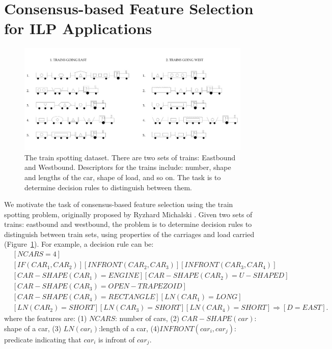 \section{Consensus-based Feature Selection for ILP Applications}
\label{sec:example}

\begin{figure}[h]
\centerline{\includegraphics[width=1\textwidth,height=0.32\textheight ]{trains.jpg}}
\caption{The train spotting dataset. There are two sets of trains: Eastbound and Westbound. Descriptors for the trains include: number, shape and lengths of the car, shape of load, and so on. The task is to determine decision rules to distinguish between them. }
\label{trains}
\end{figure} 

\noindent We motivate the task of consensus-based feature selection using the train spotting problem, originally proposed by Ryzhard Michalski \cite{Larson_77}. Given two sets of trains: eastbound and westbound, the problem is to determine decision rules to distinguish between train sets, using properties of the carriages and load carried (Figure~\ref{trains}). For example, a decision rule can be: 
 \begin{align} 
 \nonumber &[NCARS=4] \\ 
  \nonumber &[IF (CAR_1, CAR_2)][INFRONT(CAR_2,CAR_3)][INFRONT(CAR_3,CAR_4)] \\
 \nonumber
 &[CAR-SHAPE(CAR_1)=ENGINE] [CAR-SHAPE(CAR_2)=U-SHAPED] \\
 \nonumber &[CAR-SHAPE(CAR_3)=OPEN-TRAPEZOID] \\
 \nonumber &[CAR-SHAPE(CAR_4)=RECTANGLE][LN(CAR_1)=LONG] \\
 \nonumber &[LN(CAR_2)=SHORT][LN(CAR_3)=SHORT][LN(CAR_4)=SHORT] \Rightarrow [D=EAST].
\end{align}
where the features are: (1) $NCARS$: number of cars, (2) $CAR-SHAPE(car)$: shape of a car, (3) $LN(car_i)$:length of a car, (4)$INFRONT(car_i,car_j)$: predicate indicating that $car_i$ is infront of $car_j$.


